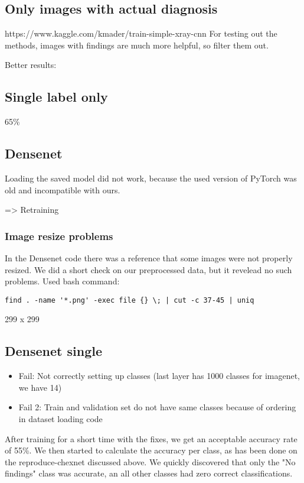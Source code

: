 \subsection{Only images with actual diagnosis}
https://www.kaggle.com/kmader/train-simple-xray-cnn 
For testing out the methods, images with findings are much more helpful, so filter them out.

Better results:


\subsection{Single label only}
65\%

\subsection{Densenet}

Loading the saved model did not work, because the used version of PyTorch was old and incompatible with ours.

=> Retraining

\subsubsection{Image resize problems}
In the Densenet code there was a reference that some images were not properly resized. We did a short check on our preprocessed data, but it revelead no such problems. Used bash command:

\begin{verbatim}
find . -name '*.png' -exec file {} \; | cut -c 37-45 | uniq
\end{verbatim}
299 x 299

\subsection{Densenet single}
\begin{itemize}
    \item Fail: Not correctly setting up classes (last layer has 1000 classes for imagenet, we have 14)
    \item Fail 2: Train and validation set do not have same classes because of ordering in dataset loading code
\end{itemize}

After training for a short time with the fixes, we get an acceptable accuracy rate of 55\%. We then started to calculate the accuracy per class, as has been done on the reproduce-chexnet discussed above. We quickly discovered that only the "No findings" class was accurate, an all other classes had zero correct classifications.

